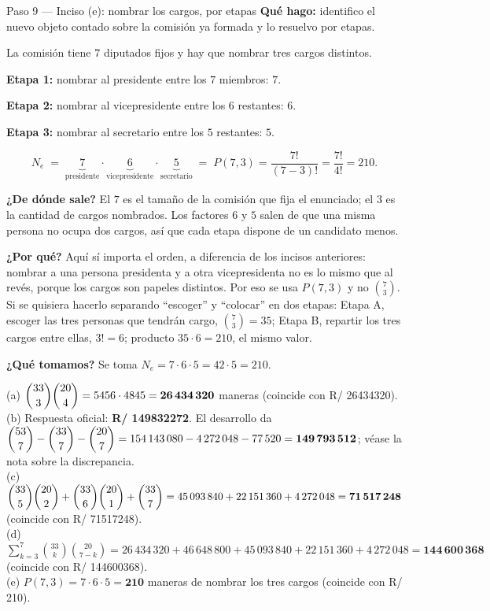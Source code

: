 \documentclass[11pt]{article}
\begin{document}
\begin{paso}{Paso 9 --- Inciso (e): nombrar los cargos, por etapas}
\textbf{Qué hago:} identifico el nuevo objeto contado sobre la comisión ya formada y lo resuelvo por etapas.

La comisión tiene $7$ diputados fijos y hay que nombrar tres cargos distintos.

\medskip
\textbf{Etapa 1:} nombrar al presidente entre los $7$ miembros: $7$.

\textbf{Etapa 2:} nombrar al vicepresidente entre los $6$ restantes: $6$.

\textbf{Etapa 3:} nombrar al secretario entre los $5$ restantes: $5$.

\medskip
\[
  N_e \;=\; \underbrace{7}_{\text{presidente}}\cdot \underbrace{6}_{\text{vicepresidente}}\cdot \underbrace{5}_{\text{secretario}} \;=\; P(7,3) = \frac{7!}{(7-3)!} = \frac{7!}{4!} = 210 .
\]

\textbf{¿De dónde sale?} El $7$ es el tamaño de la comisión que fija el enunciado; el $3$ es la cantidad de cargos nombrados. Los factores $6$ y $5$ salen de que una misma persona no ocupa dos cargos, así que cada etapa dispone de un candidato menos.

\textbf{¿Por qué?} Aquí sí importa el orden, a diferencia de los incisos anteriores: nombrar a una persona presidenta y a otra vicepresidenta no es lo mismo que al revés, porque los cargos son papeles distintos. Por eso se usa $P(7,3)$ y no $\binom{7}{3}$. Si se quisiera hacerlo separando ``escoger'' y ``colocar'' en dos etapas: Etapa A, escoger las tres personas que tendrán cargo, $\binom{7}{3}=35$; Etapa B, repartir los tres cargos entre ellas, $3!=6$; producto $35\cdot 6 = 210$, el mismo valor.

\textbf{¿Qué tomamos?} Se toma $N_e = 7\cdot 6\cdot 5 = 42\cdot 5 = 210$.
\end{paso}

\begin{resp}
(a) $\dbinom{33}{3}\dbinom{20}{4}=5456\cdot 4845=\mathbf{26\,434\,320}$ maneras (coincide con R/ 26434320).\\[2pt]
(b) Respuesta oficial: \textbf{R/ 149832272}. El desarrollo da
$\dbinom{53}{7}-\dbinom{33}{7}-\dbinom{20}{7}=154\,143\,080-4\,272\,048-77\,520=\mathbf{149\,793\,512}$; véase la nota sobre la discrepancia.\\[2pt]
(c) $\dbinom{33}{5}\dbinom{20}{2}+\dbinom{33}{6}\dbinom{20}{1}+\dbinom{33}{7}=45\,093\,840+22\,151\,360+4\,272\,048=\mathbf{71\,517\,248}$ (coincide con R/ 71517248).\\[2pt]
(d) $\displaystyle\sum_{k=3}^{7}\binom{33}{k}\binom{20}{7-k}=26\,434\,320+46\,648\,800+45\,093\,840+22\,151\,360+4\,272\,048=\mathbf{144\,600\,368}$ (coincide con R/ 144600368).\\[2pt]
(e) $P(7,3)=7\cdot 6\cdot 5=\mathbf{210}$ maneras de nombrar los tres cargos (coincide con R/ 210).
\end{resp}
\end{document}
